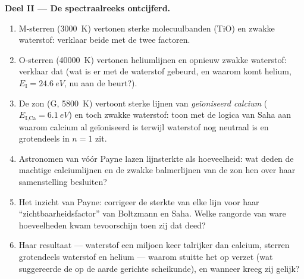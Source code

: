 \begin{problem}
\medskip\noindent\textbf{Deel II --- De spectraalreeks
ontcijferd.}
\begin{enumerate}[resume]
  \item M-sterren (\qty{3000}{K}) vertonen sterke molecuulbanden (TiO) en
        zwakke waterstof: verklaar beide met de twee factoren.
  \item O-sterren (\qty{40000}{K}) vertonen heliumlijnen en opnieuw zwakke
        waterstof: verklaar dat (wat is er met de waterstof gebeurd, en
        waarom komt helium, $E_{\text{I}} = \qty{24.6}{eV}$, nu aan de
        beurt?).
  \item De zon (G, \qty{5800}{K}) vertoont sterke lijnen van
        \emph{geïoniseerd calcium} ($E_{\text{I,Ca}} = \qty{6.1}{eV}$) en
        toch zwakke waterstof: toon met de logica van Saha aan waarom
        calcium al geïoniseerd is terwijl waterstof nog neutraal is en
        grotendeels in $n = 1$ zit.
  \item Astronomen van vóór Payne lazen lijnsterkte als hoeveelheid: wat
        deden de machtige calciumlijnen en de zwakke balmerlijnen van de
        zon hen over haar samenstelling besluiten?
  \item Het inzicht van Payne: corrigeer de sterkte van elke lijn voor
        haar ``zichtbaarheidsfactor'' van Boltzmann en Saha. Welke
        rangorde van ware hoeveelheden kwam tevoorschijn toen zij dat deed?
  \item Haar resultaat --- waterstof een miljoen keer talrijker dan
        calcium, sterren grotendeels waterstof en helium --- waarom stuitte
        het op verzet (wat suggereerde de op de aarde gerichte scheikunde),
        en wanneer kreeg zij gelijk?
\end{enumerate}


\end{problem}
